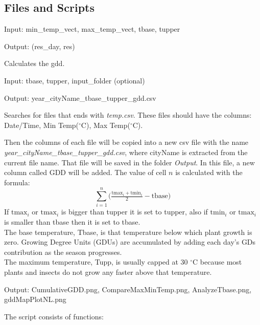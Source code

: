\documentclass[12pt]{article}
\begin{document}
\subsection{Files and Scripts}
\begin{description}
\item[calc\_gdd.py]
\item Input: min\_temp\_vect, max\_temp\_vect, tbase, tupper
\item Output: (res\_day, res)
\item Calculates the gdd. %


\item[gdd.py]
\item Input: tbase, tupper, input\_folder (optional)
\item Output: year\_cityName\_tbase\_tupper\_gdd.csv
\item Searches for files that ends with \emph{temp.csv}. These
files should have the columns: Date/Time, Min Temp(${}^\circ$C), Max Temp(${}^\circ$C).

Then the columns of each file will be copied into a new csv file with the name
\emph{year\_cityName\_tbase\_tupper\_gdd.csv}, where cityName is extracted from the
current file name. That file will be saved in the folder \emph{Output}.
In this file, a new column called GDD will be added. 
The value of
cell $n$ is calculated with the formula:
$$
\sum_{i=1}^n \big( \tfrac{\text{tmax}_i+\text{tmin}_i}{2}-\text{tbase}\big)
$$
If $\text{tmax}_i$ or $\text{tmax}_i$ is bigger than tupper it is set to tupper,
 also if $\text{tmin}_i$ or $\text{tmax}_i$ 
is  smaller than tbase then it is set to tbase.
\\The base temperature, Tbase, is that temperature below which plant growth is zero.
 Growing Degree Units (GDUs) are accumulated by adding each day's GDs contribution as the season progresses.
\\ The maximum temperature, Tupp, is usually capped at 30 ${}^\circ$C because most plants and 
insects do not grow any faster above that temperature.

\item[bokeh\_serve\_gdd.py]

\item[create\_plots.py]
\item Output: CumulativeGDD.png, CompareMaxMinTemp.png, AnalyzeTbase.png, gddMapPlotNL.png
\item The script consists of functions:


\end{description}
\end{document}
